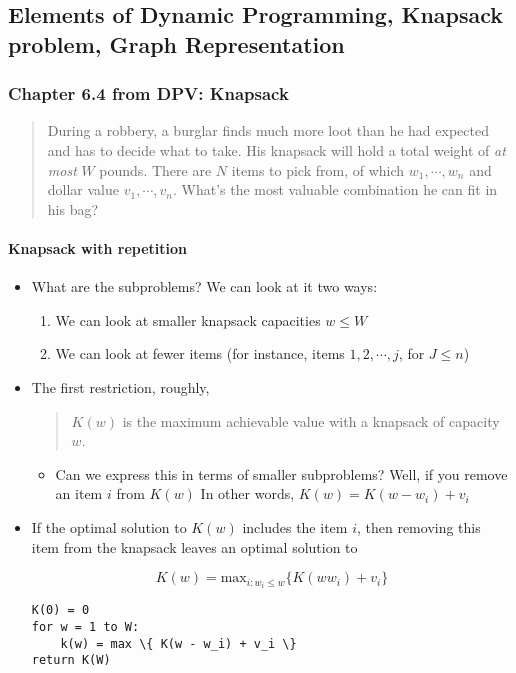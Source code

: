 \documentclass[a4paper,11pt]{article}
\begin{document}
\subsection{Elements of Dynamic Programming, Knapsack problem, Graph
Representation}\label{elements-of-dynamic-programming-knapsack-problem-graph-representation}

\subsubsection{Chapter 6.4 from DPV:
Knapsack}\label{chapter-6.4-from-dpv-knapsack}

\begin{quote}
During a robbery, a burglar finds much more loot than he had expected
and has to decide what to take. His knapsack will hold a total weight of
\emph{at most} $W$ pounds. There are $N$ items to pick from, of which
$w_1, \cdots, w_n$ and dollar value $v_1, \cdots, v_n$. What's the most
valuable combination he can fit in his bag?
\end{quote}

\paragraph{Knapsack with repetition}\label{knapsack-with-repetition}

\begin{itemize}
\item
  What are the subproblems? We can look at it two ways:

  \begin{enumerate}
  \def\labelenumi{\arabic{enumi}.}
  \itemsep1pt\parskip0pt
  \item
    We can look at smaller knapsack capacities $w \le W$
  \item
    We can look at fewer items (for instance, items $1, 2, \cdots, j$,
    for $J \le n$)
  \end{enumerate}
\item
  The first restriction, roughly,

  \begin{quote}
  $K(w)$ is the maximum achievable value with a knapsack of capacity
  $w$.
  \end{quote}

  \begin{itemize}
  \itemsep1pt\parskip0pt
  \item
    Can we express this in terms of smaller subproblems? Well, if you
    remove an item $i$ from $K(w)$ In other words,
    $K(w) = K(w - w_i) + v_i$
  \end{itemize}
\item
  If the optimal solution to $K(w)$ includes the item $i$, then removing
  this item from the knapsack leaves an optimal solution to

  \[K(w) = \text{max}_{i : w_i \le w} \lbrace K(w  w_i) + v_i \rbrace\]

\begin{verbatim}
K(0) = 0
for w = 1 to W:
    k(w) = max \{ K(w - w_i) + v_i \}
return K(W)
\end{verbatim}
\end{itemize}
\end{document}
